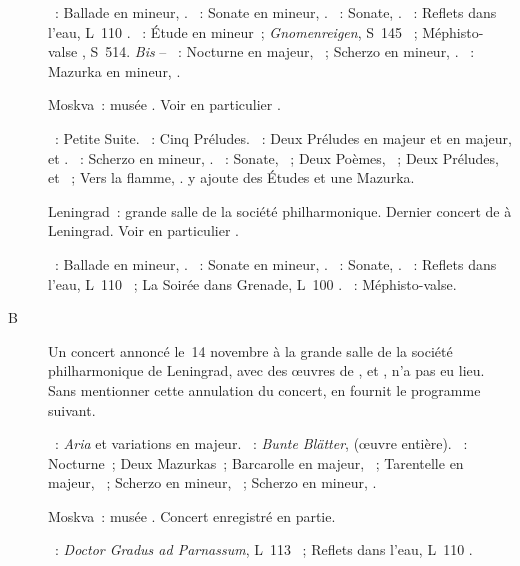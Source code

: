 \begin{description}
 \textsc{\Grieg{}}~: Ballade en \kG mineur, .
 \textsc{\Chopin{}}~: Sonate en \kB \Flat mineur, .
 \textsc{\Scriabine{}}~: Sonate, .
 \textsc{\Debussy{}}~: Reflets dans l'eau, L~110 .
 \textsc{\Liszt{}}~: Étude en \kF mineur~; \emph{Gnomenreigen}, S~145
 ~; Méphisto-valse , S~514.
 \emph{Bis} -- \textsc{\Chopin{}}~: Nocturne en \kF \Sharp majeur, 
 ~; Scherzo en \kB mineur, .
 \textsc{\Scriabine{}}~: Mazurka en \kE mineur,  .
 \item[\DateWithWeekDay{1954-10-16}]
 Moskva~: musée \Scriabine{}.
 Voir en particulier \citet[p.~448]{Milshteyn82a}.

 \textsc{\Borodine{}}~: Petite Suite.
 \textsc{\Liadov{}}~: Cinq Préludes.
 \textsc{\Rachmaninov{}}~: Deux Préludes en \kD majeur et en \kG majeur,
   et  .
 \textsc{\Chopin{}}~: Scherzo en \kB mineur, .
 \textsc{\Scriabine{}}~: Sonate, ~; Deux Poèmes, ~; Deux
 Préludes,   et  ~; Vers la flamme,
 .
 \citet[p.~178]{Nekrasova08} y ajoute des Études et une Mazurka.
 \item[\DateWithWeekDay{1954-11-12}]
 Leningrad~: grande salle de la société philharmonique.
 Dernier concert de \VSofronitsky{} à Leningrad.
 Voir en particulier \citet[p.~444-445]{Milshteyn82a}.

 \textsc{\Grieg{}}~: Ballade en \kG mineur, .
 \textsc{\Chopin{}}~: Sonate en \kB \Flat mineur, .
 \textsc{\Scriabine{}}~: Sonate, .
 \textsc{\Debussy{}}~: Reflets dans l'eau, L~110 ~; La Soirée dans
 Grenade, L~100 .
 \textsc{\Liszt{}}~: Méphisto-valse.
 \item[B\DateWithWeekDay{1954-11-14}]
 Un concert annoncé le~14 novembre à la grande salle de la société
 philharmonique de Leningrad, avec des œuvres de \Haendel{}, \Schumann{} et
 \Chopin{}, n'a pas eu lieu.
 Sans mentionner cette annulation du concert, \citet[p.~178]{Nekrasova08} en
 fournit le programme suivant.

 \textsc{\Haendel{}}~: \emph{Aria} et variations en \kE majeur.
 \textsc{\Schumann{}}~: \emph{Bunte Blätter},  (œuvre entière).
 \textsc{\Chopin{}}~: Nocturne~; Deux Mazurkas~; Barcarolle en \kF \Sharp
 majeur, ~; Tarentelle en \kA \Flat majeur, ~; Scherzo
  en \kB \Flat mineur, ~; Scherzo  en \kC
 \Sharp mineur, .
 \item[\DateWithWeekDay{1954-12-29}]
 Moskva~: musée \Scriabine{}.
 Concert enregistré en partie.

 \textsc{\Debussy{}}~: \emph{Doctor Gradus ad Parnassum}, L~113 ~;
 Reflets dans l'eau, L~110 .
\end{description}

